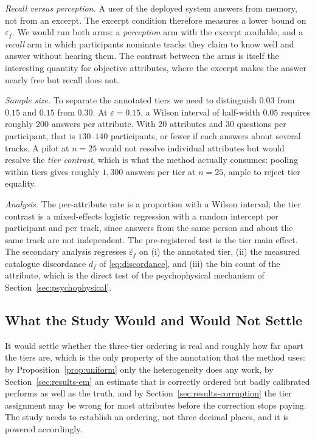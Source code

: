 \emph{Recall versus perception.} A user of the deployed system answers from
memory, not from an excerpt. The excerpt condition therefore measures a lower
bound on $\varepsilon_f$. We would run both arms: a \emph{perception} arm with
the excerpt available, and a \emph{recall} arm in which participants nominate
tracks they claim to know well and answer without hearing them. The contrast
between the arms is itself the interesting quantity for objective attributes,
where the excerpt makes the answer nearly free but recall does not.

\emph{Sample size.} To separate the annotated tiers we need to distinguish
$0.03$ from $0.15$ and $0.15$ from $0.30$. At $\varepsilon = 0.15$, a Wilson
interval of half-width $0.05$ requires roughly $200$ answers per attribute.
With $20$ attributes and $30$ questions per participant, that is $130$--$140$
participants, or fewer if each answers about several tracks. A pilot at $n=25$
would not resolve individual attributes but would resolve the \emph{tier
contrast}, which is what the method actually consumes: pooling within tiers
gives roughly $1{,}300$ answers per tier at $n=25$, ample to reject tier
equality.

\emph{Analysis.} The per-attribute rate is a proportion with a Wilson interval;
the tier contrast is a mixed-effects logistic regression with a random
intercept per participant and per track, since answers from the same person and
about the same track are not independent. The pre-registered test is the tier
main effect. The secondary analysis regresses $\hat\varepsilon_f$ on (i) the
annotated tier, (ii) the measured catalogue discordance $d_f$ of
\eqref{eq:discordance}, and (iii) the bin count of the attribute, which is the
direct test of the psychophysical mechanism of
Section~\ref{sec:psychophysical}.

\subsection*{What the Study Would and Would Not Settle}

It would settle whether the three-tier ordering is real and roughly how far
apart the tiers are, which is the only property of the annotation that the
method uses: by Proposition~\ref{prop:uniform} only the heterogeneity does any
work, by Section~\ref{sec:results-em} an estimate that is correctly ordered but
badly calibrated performs as well as the truth, and by
Section~\ref{sec:results-corruption} the tier assignment may be wrong for most
attributes before the correction stops paying. The study needs to establish an
ordering, not three decimal places, and it is powered accordingly.

